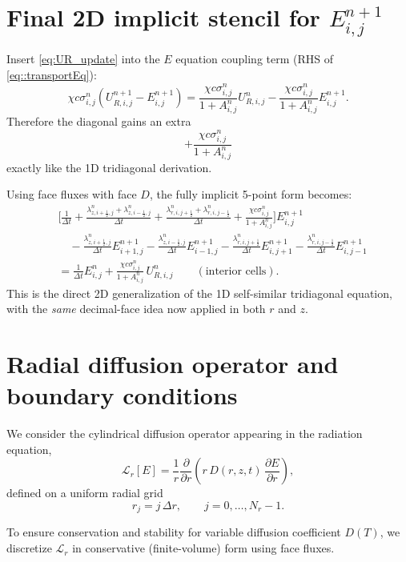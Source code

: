 \documentclass[11pt]{article}
\begin{document}
\section{Final 2D implicit stencil for $E^{n+1}_{i,j}$}
Insert \eqref{eq:UR_update} into the $E$ equation coupling term (RHS of \eqref{eq::transportEq}):
\[
\chi c\sigma^n_{i,j}(U^{n+1}_{R,i,j}-E^{n+1}_{i,j})
= \frac{\chi c\sigma^n_{i,j}}{1+A^n_{i,j}}U^n_{R,i,j}
-\frac{\chi c\sigma^n_{i,j}}{1+A^n_{i,j}}E^{n+1}_{i,j}.
\]
Therefore the diagonal gains an extra
\[
+\frac{\chi c\sigma^n_{i,j}}{1+A^n_{i,j}}
\]
exactly like the 1D tridiagonal derivation.

Using face fluxes with face $D$, the fully implicit 5-point form becomes:
\begin{align}
&\Bigg[
\frac{1}{\Delta t}
+ \frac{\lambda^{n}_{z,i+\frac12,j}+\lambda^{n}_{z,i-\frac12,j}}{\Delta t}
+ \frac{\lambda^{n}_{r,i,j+\frac12}+\lambda^{n}_{r,i,j-\frac12}}{\Delta t}
+ \frac{\chi c\sigma^n_{i,j}}{1+A^n_{i,j}}
\Bigg]E^{n+1}_{i,j}
\nonumber\\
&\quad
-\frac{\lambda^{n}_{z,i+\frac12,j}}{\Delta t}E^{n+1}_{i+1,j}
-\frac{\lambda^{n}_{z,i-\frac12,j}}{\Delta t}E^{n+1}_{i-1,j}
-\frac{\lambda^{n}_{r,i,j+\frac12}}{\Delta t}E^{n+1}_{i,j+1}
-\frac{\lambda^{n}_{r,i,j-\frac12}}{\Delta t}E^{n+1}_{i,j-1}
\nonumber\\
&=
\frac{1}{\Delta t}E^{n}_{i,j}
+\frac{\chi c\sigma^n_{i,j}}{1+A^n_{i,j}}\,U^n_{R,i,j}
\qquad (\text{interior cells}). \label{eq:2D_selfsim_stencil}
\end{align}
This is the direct 2D generalization of the 1D self-similar tridiagonal equation, with the \emph{same} decimal-face idea now applied in both $r$ and $z$.

\section{Radial diffusion operator and boundary conditions}

We consider the cylindrical diffusion operator appearing in the radiation equation,
\begin{equation}
\mathcal{L}_r[E]
=
\frac{1}{r}\frac{\partial}{\partial r}
\left(
r\,D(r,z,t)\,\frac{\partial E}{\partial r}
\right),
\end{equation}
defined on a uniform radial grid
\[
r_j = j\,\Delta r,
\qquad j = 0,\dots,N_r-1.
\]

To ensure conservation and stability for variable diffusion coefficient $D(T)$,
we discretize $\mathcal{L}_r$ in conservative (finite-volume) form using face fluxes.
\end{document}
